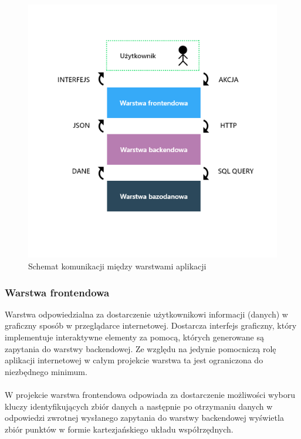 \documentclass[eng,printmode]{mgr}
\begin{document}
\begin{figure}[H]
  \begin{center}
  \includegraphics[scale=0.7]{layers}
  \end{center}
  \caption{Schemat komunikacji między warstwami aplikacji}
\end{figure}

\subsubsection{Warstwa frontendowa}
Warstwa odpowiedzialna za dostarczenie użytkownikowi informacji (danych) w graficzny sposób w przeglądarce internetowej. Dostarcza interfejs graficzny, który implementuje interaktywne elementy za pomocą, których generowane są zapytania do warstwy backendowej. Ze względu na jedynie pomocniczą rolę aplikacji internetowej w całym projekcie warstwa ta jest ograniczona do niezbędnego minimum.
\\\\
W projekcie warstwa frontendowa odpowiada za dostarczenie możliwości wyboru  kluczy identyfikujących zbiór danych a następnie po otrzymaniu danych w odpowiedzi zwrotnej wysłanego zapytania do warstwy backendowej wyświetla zbiór punktów w formie kartezjańskiego układu współrzędnych.
\end{document}
